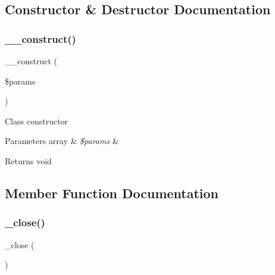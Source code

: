 \subsection{Constructor \& Destructor Documentation}
\mbox{\label{class_c_i___d_b__odbc__driver_a9162320adff1a1a4afd7f2372f753a3e}} 
\subsubsection{\texorpdfstring{\+\_\+\+\_\+construct()}{\_\_construct()}}
{\footnotesize\ttfamily \+\_\+\+\_\+construct (\begin{DoxyParamCaption}\item[{}]{\$params }\end{DoxyParamCaption})}

Class constructor


\begin{DoxyParams}[1]{Parameters}
array & {\em \$params} & \\
\hline
\end{DoxyParams}
\begin{DoxyReturn}{Returns}
void 
\end{DoxyReturn}


\subsection{Member Function Documentation}
\mbox{\label{class_c_i___d_b__odbc__driver_a4d9082658000e5ede8312067c6dda9db}} 
\subsubsection{\texorpdfstring{\+\_\+close()}{\_close()}}
{\footnotesize\ttfamily \+\_\+close (\begin{DoxyParamCaption}{ }\end{DoxyParamCaption})\hspace{0.3cm}{\ttfamily [protected]}}

